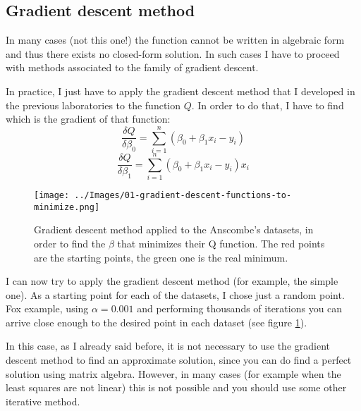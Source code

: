     \subsection{Gradient descent method}
        In many cases (not this one!) the function cannot be written in algebraic form and thus there exists no closed-form solution. In such cases I have to proceed with methods associated to the family of gradient descent.\par
        In practice, I just have to apply the gradient descent method that I developed in the previous laboratories to the function \(Q\). In order to do that, I have to find which is the gradient of that function:
        \[\frac{\delta Q}{\delta \beta_0} = \sum_{i=1}^{n}(\beta_0 +\beta_1 x_i - y_i)\]
        \[\frac{\delta Q}{\delta \beta_1} = \sum_{i=1}^{n}(\beta_0 +\beta_1 x_i - y_i)x_i\]
        \begin{figure}
            \centering
            \texttt{[image: ../Images/01-gradient-descent-functions-to-minimize.png]}
            \caption{Gradient descent method applied to the Anscombe's datasets, in order to find the \(\beta\) that minimizes their Q function. The red points are the starting points, the green one is the real minimum.}
            \label{gradient-descent-functions-to-minimize}
        \end{figure}
        I can now try to apply the gradient descent method (for example, the simple one). As a starting point for each of the datasets, I chose just a random point. Fox example, using \(\alpha=0.001\) and performing thousands of iterations you can arrive close enough to the desired point in each dataset (see figure \ref{gradient-descent-functions-to-minimize}).\par
        In this case, as I already said before, it is not necessary to use the gradient descent method to find an approximate solution, since you can do find a perfect solution using matrix algebra. However, in many cases (for example when the least squares are not linear) this is not possible and you should use some other iterative method.